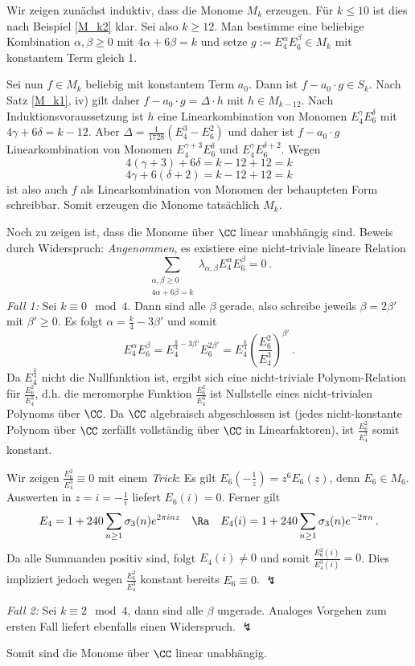 \begin{bewe}
Wir zeigen zunächst induktiv, dass die Monome $M_k$ erzeugen. Für $k \leq 10$ ist dies nach Beispiel \ref{M_k2} klar. Sei also $k \geq 12$. Man bestimme eine beliebige Kombination $\alpha, \beta \geq 0$ mit $4 \alpha + 6 \beta = k$ und setze $g := E_4^\alpha E_6^\beta \in M_k$ mit konstantem Term gleich 1.

Sei nun $f \in M_k$ beliebig mit konstantem Term $a_0$. Dann ist $f - a_0 \cdot g \in S_k$. Nach Satz \ref{M_k1}, iv) gilt daher $f - a_0 \cdot g = \Delta \cdot h$ mit $h \in M_{k-12}$. Nach Induktionsvoraussetzung ist $h$ eine Linearkombination von Monomen $E_4^\gamma E_6^\delta$ mit $4 \gamma + 6 \delta = k - 12$. Aber $\Delta = \frac{1}{1728} (E_4^3 - E_6^2)$ und daher ist $f - a_0 \cdot g$ Linearkombination von Monomen $E_4^{\gamma + 3}E_6^{\delta}$ und $E_4^{\gamma}E_6^{\delta + 2}$. Wegen
\[
4(\gamma + 3) + 6 \delta = k - 12 + 12 = k
\]
\[
4 \gamma + 6 (\delta + 2) = k - 12 + 12 = k
\]
ist also auch $f$ als Linearkombination von Monomen der behaupteten Form schreibbar. Somit erzeugen die Monome tatsächlich $M_k$.

Noch zu zeigen ist, dass die Monome über $\CC$ linear unabhängig sind. Beweis durch Widerspruch: \emph{Angenommen}, es existiere eine nicht-triviale lineare Relation
\[
\sum_{\substack{\alpha, \beta \geq 0\\ 4 \alpha + 6 \beta = k}} \lambda_{\alpha, \beta} E_4^\alpha E_6^\beta = 0
\,.
\]
\emph{Fall 1:} Sei $k \equiv 0 \mod 4$. Dann sind alle $\beta$ gerade, also schreibe jeweils $\beta = 2 \beta'$ mit $\beta' \geq 0$. Es folgt $\alpha = \frac k4 - 3 \beta'$ und somit
\[
E_4^\alpha E_6^\beta = E_4^{\frac k4 - 3\beta'}E_6^{2\beta'} = E_4^{\frac k4} \left( \frac {E_6^2}{E_4^3} \right)^{\beta'}
\,.
\]
Da $E_4^{\frac k4}$ nicht die Nullfunktion ist, ergibt sich eine nicht-triviale Polynom-Relation für $\frac{E_6^2}{E_4^3}$, d.h. die meromorphe Funktion $\frac{E_6^2}{E_4^3}$ ist Nullstelle eines nicht-trivialen Polynoms über $\CC$. Da $\CC$ algebraisch abgeschlossen ist (jedes nicht-konstante Polynom über $\CC$ zerfällt vollständig über $\CC$ in Linearfaktoren), ist $\frac{E_6^2}{E_4^3}$ somit konstant.

Wir zeigen $\frac{E_6^2}{E_4^3} \equiv 0$ mit einem \emph{Trick}: Es gilt $E_6 (- \frac 1z) = z^6 E_6(z)$, denn $E_6 \in M_6$. Auswerten in $z = i = - \frac 1i$ liefert $E_6 (i) = 0$. Ferner gilt
\[
E_4 = 1 + 240 \sum_{n \geq 1} \sigma_3 (n) e^{2\pi i n z} \quad \Ra \quad E_4 (i) = 1 + 240 \sum_{n \geq 1} \sigma_3 (n) e^{-2 \pi n}
\,.
\] 
Da alle Summanden positiv sind, folgt $E_4(i) \neq 0$ und somit $\frac{E_6^2(i)}{E_4^3(i)} = 0$. Dies impliziert jedoch wegen $\frac{E_6^2}{E_4^3}$ konstant bereits $E_6 \equiv 0$. $\lightning$

\emph{Fall 2:} Sei $k \equiv 2 \mod 4$, dann sind alle $\beta$ ungerade. Analoges Vorgehen zum ersten Fall liefert ebenfalls einen Widerspruch. $\lightning$

Somit sind die Monome über $\CC$ linear unabhängig.
\end{bewe}

